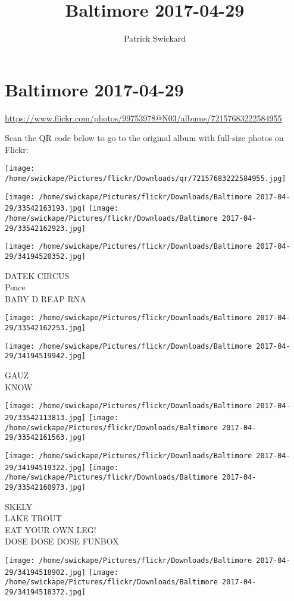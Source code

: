\documentclass[10pt,letterpaper]{article}
\title{Baltimore 2017-04-29}
\author{Patrick Swickard}
\date{}
\begin{document}
\section*{Baltimore 2017-04-29}

\url{https://www.flickr.com/photos/99753978@N03/albums/72157683222584955}

Scan the QR code below to go to the original album with full-size photos on Flickr:

\texttt{[image: /home/swickape/Pictures/flickr/Downloads/qr/72157683222584955.jpg]}
\pagebreak

\texttt{[image: /home/swickape/Pictures/flickr/Downloads/Baltimore 2017-04-29/33542163193.jpg]}
\texttt{[image: /home/swickape/Pictures/flickr/Downloads/Baltimore 2017-04-29/33542162923.jpg]}

\texttt{[image: /home/swickape/Pictures/flickr/Downloads/Baltimore 2017-04-29/34194520352.jpg]}

DATEK CIRCUS\\
Peace\\
BABY D REAP RNA
\pagebreak

\texttt{[image: /home/swickape/Pictures/flickr/Downloads/Baltimore 2017-04-29/33542162253.jpg]}

\vspace{0.25in}
\texttt{[image: /home/swickape/Pictures/flickr/Downloads/Baltimore 2017-04-29/34194519942.jpg]}

GAUZ\\
KNOW
\pagebreak

\texttt{[image: /home/swickape/Pictures/flickr/Downloads/Baltimore 2017-04-29/33542113813.jpg]}
\texttt{[image: /home/swickape/Pictures/flickr/Downloads/Baltimore 2017-04-29/33542161563.jpg]}

\texttt{[image: /home/swickape/Pictures/flickr/Downloads/Baltimore 2017-04-29/34194519322.jpg]}
\texttt{[image: /home/swickape/Pictures/flickr/Downloads/Baltimore 2017-04-29/33542160973.jpg]}

SKELY\\
LAKE TROUT\\
EAT YOUR OWN LEG!\\
DOSE DOSE DOSE FUNBOX
\pagebreak

\texttt{[image: /home/swickape/Pictures/flickr/Downloads/Baltimore 2017-04-29/34194518902.jpg]}
\texttt{[image: /home/swickape/Pictures/flickr/Downloads/Baltimore 2017-04-29/34194518372.jpg]}
\end{document}
